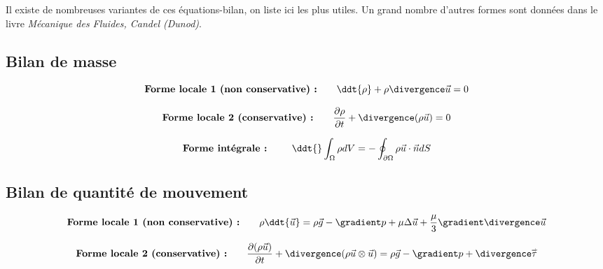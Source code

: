Il existe de nombreuses variantes de ces équations-bilan, on liste ici les plus utiles. Un grand nombre d'autres formes sont données dans le livre {\em Mécanique des Fluides, Candel (Dunod)}.

\subsection{Bilan de masse}
\begin{equation}
\mbox{\bf Forme locale 1 (non conservative)  :} 
\qquad  
\ddt{\rho} + \rho \divergence \vec{u} = 0
\end{equation}

\begin{equation}
\mbox{\bf Forme locale 2 (conservative) :}
\qquad  
\dpa{\rho}{t} + \divergence ( \rho \vec{u})  = 0
\end{equation}

\begin{equation}
\mbox{\bf Forme intégrale : } 
\qquad  
\ddt{} \int_{\Omega}  \rho dV = - \oint_{\partial \Omega} \rho \vec{u} \cdot \vec{n} dS
\end{equation}


\subsection{Bilan de quantité de mouvement}
\begin{equation}
\mbox{\bf Forme locale 1 (non conservative)  :} 
\qquad  
		\rho \ddt{\vec{u}} 
		= 
		\rho \vec{g}  - \gradient p + \mu \Delta \vec{u} + \frac{\mu}{3} \gradient \divergence \vec{u} 
\end{equation}
	
	

\begin{equation}
\mbox{\bf Forme locale 2 (conservative) :}
\qquad  
	 \dpa{(\rho \vec{u})}{t} + \divergence (\rho \vec{u} \otimes \vec{u})
		= \rho \vec{g}  - \gradient p + \divergence \mytensor{\tau}
\end{equation}

